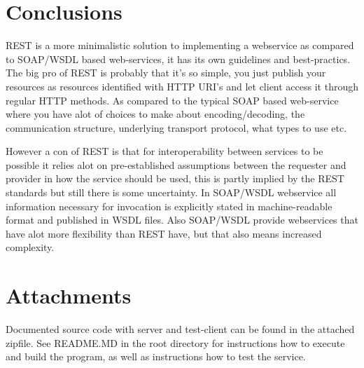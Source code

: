 \documentclass[a4paper, 11pt]{article}
\begin{document}
\section*{Conclusions}
REST is a more minimalistic solution to implementing a webservice as compared to SOAP/WSDL based web-services, it has its own guidelines and best-practics. The big pro of REST is probably that it's so simple, you just publish your resources as resources identified with HTTP URI's and let client access it through regular HTTP methods. As compared to the typical SOAP based web-service where you have alot of choices to make about encoding/decoding, the communication structure, underlying transport protocol, what types to use etc.

However a con of REST is that for interoperability between services to be possible it relies alot on pre-established assumptions between the requester and provider in how the service should be used, this is partly implied by the REST standards but still there is some uncertainty. In SOAP/WSDL webservice all information necessary for invocation is explicitly stated in machine-readable format and published in WSDL files. Also SOAP/WSDL provide webservices that have alot more flexibility than REST have, but that also means increased complexity.

\section*{Attachments}
Documented source code with server and test-client can be found in the attached zipfile. See README.MD in the root directory for instructions how to execute and build the program, as well as instructions how to test the service.

{}

\end{document}
